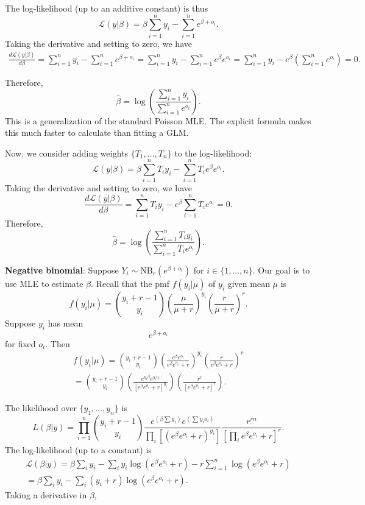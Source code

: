 \documentclass[12pt]{article}
\begin{document}
The log-likelihood (up to an additive constant) is thus
$$ \mathcal{L}(y | \beta) = \beta \sum_{i=1}^n y_i -\sum_{i=1}^n e^{\beta + o_i}.$$
Taking the derivative and setting to zero, we have
\begin{multline*} \frac{  d \mathcal{L}(y | \beta) }{ d \beta} = \sum_{i=1}^n y _i - \sum_{i=1}^n e^{\beta + o_i} =\sum_{i=1}^n y_i - \sum_{i=1}^n e^\beta e^{o_i} = \sum_{i = 1}^n y_i - e^\beta \left( \sum_{i=1}^n e^{o_i}  \right) = 0.
\end{multline*}

Therefore,
$$ \hat{\beta} = \log \left( \frac{ \sum_{i=1}^n y_i }{ \sum_{i=1}^n e^{o_i} } \right).$$ This is a generalization of the standard Poisson MLE. The explicit formula makes this much faster to calculate than fitting a GLM.

Now, we consider adding weights $\{T_1, \dots, T_n \}$ to the log-likelihood:
$$ \mathcal{L}(y|\beta) = \beta \sum_{i=1}^n T_i y_i - \sum_{i=1}^n T_i e^{\beta}e^{o_i} .$$ Taking the derivative and setting to zero, we have
$$ \frac{ d \mathcal{L}(y|\beta) }{ d\beta} = \sum_{i=1}^n T_i y_i - e^\beta \sum_{i-1}^n T_i e^{o_i} = 0.$$ Therefore,
$$ \hat{\beta} = \log\left( \frac{ \sum_{i=1}^n T_i y_i }{ \sum_{i=1}^n T_i e^{o_i}} \right).$$


\textbf{Negative binomial}: Suppose $Y_i \sim \textrm{NB}_r(e^{\beta + o_i})$ for $i \in \{ 1, \dots, n \}$. Our goal is to use MLE to estimate $\beta$. Recall that the pmf $f(y_i | \mu)$ of $y_i$ given mean $\mu$ is
$$ f(y_i | \mu) = \binom{y_i + r - 1}{y_i} \left( \frac{ \mu }{ \mu + r } \right)^{y_i} \left( \frac{ r }{ \mu + r }  \right)^r.$$ Suppose $y_i$ has mean $$e^{\beta + o_i}$$ for fixed $o_i$. Then 
\begin{multline*}
f(y_i | \mu) = \binom{y_i + r - 1}{y_i} \left( \frac{ e^{\beta} e^{o_i} }{ e^{\beta}e^{o_i} + r } \right)^{y_i} \left( \frac{ r }{ e^{\beta}e^{o_i} + r } \right)^r \\ = \binom{y_i + r - 1}{y_i} \left( \frac{ e^{y_i\beta} e^{y_i o_i} }{ [e^\beta e^{o_i} + r]^{y_i} } \right) \left( \frac{r^r}{[e^{\beta} e^{o_i} + r ]^r} \right).
\end{multline*}

The likelihood over $\{y_1, \dots, y_n\}$ is
$$ L(\beta | y) = \prod_{i=1}^n \binom{ y_i + r - 1 }{ y_i }  \frac{ e^{ (\beta \sum y_i)} e^{\left(\sum y_i o_i \right)} }{  \prod_{i} \left[ \left( e^\beta e^{o_i} + r \right)^{y_i} \right] } \frac{ r^{rn} }{ \left[ \prod_i e^{\beta} e^{o_i} + r \right]^r }.$$
 The log-likelihood (up to a constant) is
 \begin{multline*} \mathcal{L}(\beta | y) = \beta \sum_i y_i - \sum_{i}  y_i \log\left( e^\beta e^{o_i} + r \right) - r \sum_{i=1}^n \log( e^{\beta} e^{o_i} + r ) \\ = \beta \sum_{i} y_i - \sum_{i} (y_i + r) \log ( e^\beta e^{o_i} + r ). \end{multline*} Taking a derivative in $\beta$, 
\end{document}
